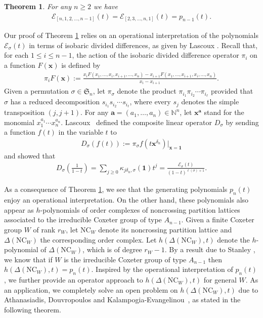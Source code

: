 \documentclass[12pt]{article}
\newtheorem{thm}{Theorem}[section]
\newcommand{\PP}{p}
\newcommand{\NC}{\mathrm{NC}}
\numberwithin{equation}{section}
\begin{document}
\begin{thm}\label{main-thm-com-in}
For any $n \geq 2$ we have
\begin{align}\label{first-main-eq}
{\mathcal{E}}_{[n, 1,2,\ldots,n-1]}(t)={\mathcal{E}}_{[2,3,\ldots,n,1]}(t)=\PP_{n-1}(t).
\end{align}
\end{thm}

Our proof of Theorem \ref{main-thm-com-in} relies on an operational interpretation of the polynomials ${\mathcal{E}}_{\sigma}(t)$ in terms of isobaric divided differences, as given by Lascoux \cite{Lascoux-2016}. 
Recall that, for each $1\leq i\leq n-1$, the action of the isobaric divided difference operator 
$\pi_i$ on a function $F(\mathbf{x})$ is defined by
\begin{align}\label{eq-isobaric-operator}
 \pi_iF(\mathbf{x}):=\frac{x_iF(x_1,\ldots,x_i,x_{i+1},\ldots,x_n)-x_{i+1} F(x_1,\ldots,x_{i+1},x_i,\ldots,x_n)}{x_i-x_{i+1}}.
\end{align}
Given a permutation $\sigma\in\mathfrak{S}_n$, let $\pi_\sigma$ denote the product 
$\pi_{i_1} \pi_{i_2} \cdots \pi_{i_\ell}$ provided that $\sigma$ has a reduced decomposition $s_{i_1} s_{i_2} \cdots s_{i_\ell}$, where every $s_j$ denotes the simple transposition $(j,j+1)$.
For any $\mathbf{a} = (a_1, \ldots, a_n)\in\mathbb{N}^n$, let $\mathbf{x}^{\mathbf{a}}$ stand for the monomial $x_1^{a_1}\cdots x_n^{a_n}$. Lascoux~\cite{Lascoux-2016} 
defined the composite linear operator $D_\sigma$ by sending a function $f(t)$ in the variable $t$ to
\begin{align*}
D_\sigma(f(t)):=\pi_\sigma f(t \mathbf{x}^{\delta_n})\big|_{\mathbf{x} = \mathbf{1}}    
\end{align*}
and showed that 
\begin{align}\label{4}
D_\sigma\left(\frac{1}{1 - t}\right)
=\sum_{j\geq 0} \kappa_{j\delta_n, \sigma}(\textbf{1}) t^j=\frac{\mathcal{E}_{\sigma}(t)}{(1-t)^{\ell(\sigma) +1}}.
\end{align}

As a consequence of Theorem \ref{main-thm-com-in}, we see that the generating polynomials $\PP_{n}(t)$
enjoy an operational interpretation. On the other hand,  
these polynomials also appear as $h$-polynomials of 
order complexes of noncrossing partition lattices associated to the irreducible Coxeter group of type $A_{n-1}$. 
Given a finite Coxeter group  $W$ of rank $r_W$, let $\NC_W$ denote its noncrossing partition lattice and $\Delta(\NC_W)$ the corresponding order complex. 
Let $h(\Delta(\NC_W),t)$ denote the $h$-polynomial of $\Delta(\NC_W)$, which is of degree $r_W-1$. 
By a result due to Stanley \cite{Stanley-1997}, we know that if $W$ is the irreducible Coxeter group of type $A_{n-1}$ then
$h(\Delta(\NC_W),t)={\PP}_{n}(t).$
Inspired by the operational interpretation of ${\PP}_{n}(t)$, we further provide an operator approach to $h(\Delta(\NC_W),t)$ for general $W$. As an application, we completely solve
an open problem on $h(\Delta(\NC_W),t)$ due to  
Athanasiadis, Douvropoulos and Kalampogia-Evangelinou~{\cite[Question 20]{Athanasiadis-Douvropoulos-Kalampogia-Evangelinou-2024}}, as stated in the following theorem.
\end{document}

